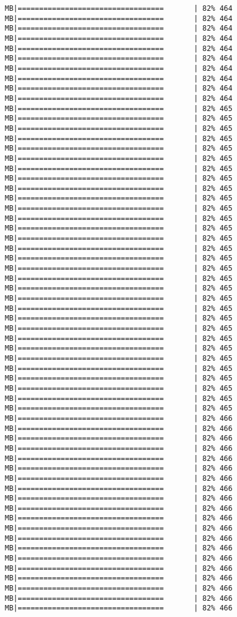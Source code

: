 \documentclass[
]{article}
\begin{document}
\begin{verbatim}
MB|==================================       | 82% 464 MB|==================================       | 82% 464 MB|==================================       | 82% 464 MB|==================================       | 82% 464 MB|==================================       | 82% 464 MB|==================================       | 82% 464 MB|==================================       | 82% 464 MB|==================================       | 82% 464 MB|==================================       | 82% 464 MB|==================================       | 82% 464 MB|==================================       | 82% 465 MB|==================================       | 82% 465 MB|==================================       | 82% 465 MB|==================================       | 82% 465 MB|==================================       | 82% 465 MB|==================================       | 82% 465 MB|==================================       | 82% 465 MB|==================================       | 82% 465 MB|==================================       | 82% 465 MB|==================================       | 82% 465 MB|==================================       | 82% 465 MB|==================================       | 82% 465 MB|==================================       | 82% 465 MB|==================================       | 82% 465 MB|==================================       | 82% 465 MB|==================================       | 82% 465 MB|==================================       | 82% 465 MB|==================================       | 82% 465 MB|==================================       | 82% 465 MB|==================================       | 82% 465 MB|==================================       | 82% 465 MB|==================================       | 82% 465 MB|==================================       | 82% 465 MB|==================================       | 82% 465 MB|==================================       | 82% 465 MB|==================================       | 82% 465 MB|==================================       | 82% 465 MB|==================================       | 82% 465 MB|==================================       | 82% 465 MB|==================================       | 82% 465 MB|==================================       | 82% 465 MB|==================================       | 82% 466 MB|==================================       | 82% 466 MB|==================================       | 82% 466 MB|==================================       | 82% 466 MB|==================================       | 82% 466 MB|==================================       | 82% 466 MB|==================================       | 82% 466 MB|==================================       | 82% 466 MB|==================================       | 82% 466 MB|==================================       | 82% 466 MB|==================================       | 82% 466 MB|==================================       | 82% 466 MB|==================================       | 82% 466 MB|==================================       | 82% 466 MB|==================================       | 82% 466 MB|==================================       | 82% 466 MB|==================================       | 82% 466 MB|==================================       | 82% 466 MB|==================================       | 82% 466 MB|==================================       | 82% 466 
\end{verbatim}
\end{document}
